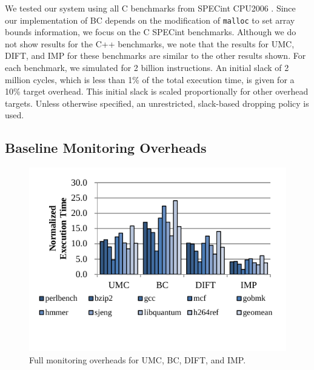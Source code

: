We tested our system using all C benchmarks from SPECint
CPU2006 \cite{spec2006}. Since our implementation of BC depends on the
modification of {\tt malloc} to set array bounds information, we focus on the C
SPECint benchmarks. Although we do not
show results for the C++ benchmarks, we note that the results for UMC, DIFT, and IMP
for these benchmarks are similar to the other results shown. For each
benchmark, we simulated for 2 billion instructions. An initial slack of 2
million cycles, which is less than 1\% of
the total execution time, is given for a 10\% target overhead. This initial
slack is scaled proportionally for other overhead targets. Unless otherwise
specified, an unrestricted, slack-based dropping policy is used.

\subsection{Baseline Monitoring Overheads}

\begin{figure}
  \begin{center}
    \includegraphics[width=\columnwidth]{figs/data_full_mon.pdf}
    \vspace{-0.2in}
    \caption{Full monitoring overheads for UMC, BC, DIFT, and IMP.}
    \label{fig:evaluation.full_mon}
    \vspace{-0.1in}
  \end{center}
\end{figure} 

